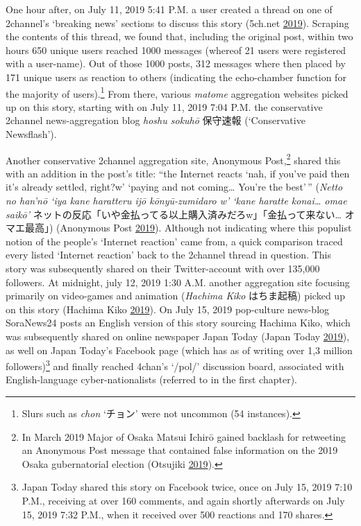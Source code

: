 \documentclass[10pt,british,A4paper,oneside]{memoir}
\begin{document}
One hour after, on July 11, 2019 5:41 P.M. a user created a thread on
one of 2channel's `breaking news' sections to discuss this story
(5ch.net \protect\hyperlink{ref-5ch.net_eng._2019}{2019}). Scraping the contents of this thread, we found that,
including the original post, within two hours 650 unique users reached
1000 messages (whereof 21 users were registered with a user-name). Out
of those 1000 posts, 312 messages where then placed by 171 unique users
as reaction to others (indicating the echo-chamber function for the
majority of users).\footnote{Slurs such as \emph{chon} `チョン' were not
  uncommon (54 instances).} From there, various \emph{matome}
aggregation websites picked up on this story, starting with on July 11,
2019 7:04 P.M. the conservative 2channel news-aggregation blog
\emph{hoshu sokuhō} 保守速報 (`Conservative Newsflash').

Another conservative 2channel aggregation site, Anonymous
Post,\footnote{In March 2019 Major of Osaka Matsui Ichirō gained
  backlash for retweeting an Anonymous Post message that contained false
  information on the 2019 Osaka gubernatorial election (Otsujiki
  \protect\hyperlink{ref-otsujiki_eng._2019}{2019}).} shared this with
an addition in the post's title: ``the Internet reacts `nah, if you've
paid then it's already settled, right?w' `paying and not coming\ldots{}
You're the best'\,'' (\emph{Netto no han'nō `iya kane haratteru ijō
kōnyū-zumidaro w' `kane haratte konai\ldots{} omae saikō'}
ネットの反応「いや金払ってる以上購入済みだろw」「金払って来ない\ldots{}
オマエ最高」) (Anonymous Post
\protect\hyperlink{ref-anonymous_post_eng._2019}{2019}). Although not
indicating where this populist notion of the people's `Internet
reaction' came from, a quick comparison traced every listed `Internet
reaction' back to the 2channel thread in question. This story was
subsequently shared on their Twitter-account with over 135,000
followers. At midnight, july 12, 2019 1:30 A.M. another aggregation site
focusing primarily on video-games and animation (\emph{Hachima Kiko}
はちま起稿) picked up on this story (Hachima Kiko
\protect\hyperlink{ref-hachima_kiko_eng:_2019}{2019}). On July 15, 2019 pop-culture news-blog SoraNews24 posts an English version of this story
sourcing Hachima Kiko, which was subsequently shared on online newspaper
Japan Today (Japan Today
\protect\hyperlink{ref-japan_today_popular_2019}{2019}), as well on 
Japan Today's Facebook page (which has as of writing over 1,3 million
followers)\footnote{Japan Today shared this story on Facebook twice,
  once on July 15, 2019 7:10 P.M., receiving at over 160 comments, and
  again shortly afterwards on July 15, 2019 7:32 P.M., when it received
  over 500 reactions and 170 shares.} and finally reached 4chan's
`/pol/' discussion board, associated with English-language
cyber-nationalists (referred to in the first chapter).
\end{document}
